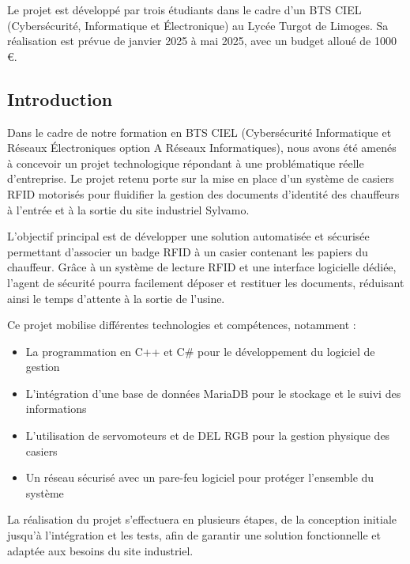 \documentclass[main.tex]{subfiles}
\begin{document}
Le projet est développé par trois étudiants dans le cadre d’un BTS CIEL (Cybersécurité, Informatique et Électronique) au Lycée Turgot de Limoges. Sa réalisation est prévue de janvier 2025 à mai 2025, avec un budget alloué de 1000 €.


\subsection{Introduction}

\quad Dans le cadre de notre formation en BTS CIEL (Cybersécurité Informatique et Réseaux Électroniques option A Réseaux Informatiques), nous avons été amenés à concevoir un projet technologique répondant à une problématique réelle d’entreprise. Le projet retenu porte sur la mise en place d’un système de casiers RFID motorisés pour fluidifier la gestion des documents d’identité des chauffeurs à l’entrée et à la sortie du site industriel Sylvamo.

L’objectif principal est de développer une solution automatisée et sécurisée permettant d’associer un badge RFID à un casier contenant les papiers du chauffeur. Grâce à un système de lecture RFID et une interface logicielle dédiée, l’agent de sécurité pourra facilement déposer et restituer les documents, réduisant ainsi le temps d’attente à la sortie de l’usine.

Ce projet mobilise différentes technologies et compétences, notamment :

\begin{itemize}
   \item La programmation en C++ et C\# pour le développement du logiciel de gestion
   \item L’intégration d’une base de données MariaDB pour le stockage et le suivi des informations
   \item L’utilisation de servomoteurs et de DEL RGB pour la gestion physique des casiers
   \item Un réseau sécurisé avec un pare-feu logiciel pour protéger l’ensemble du système
\end{itemize}

La réalisation du projet s’effectuera en plusieurs étapes, de la conception initiale jusqu’à l’intégration et les tests, afin de garantir une solution fonctionnelle et adaptée aux besoins du site industriel.

\newpage
\end{document}

